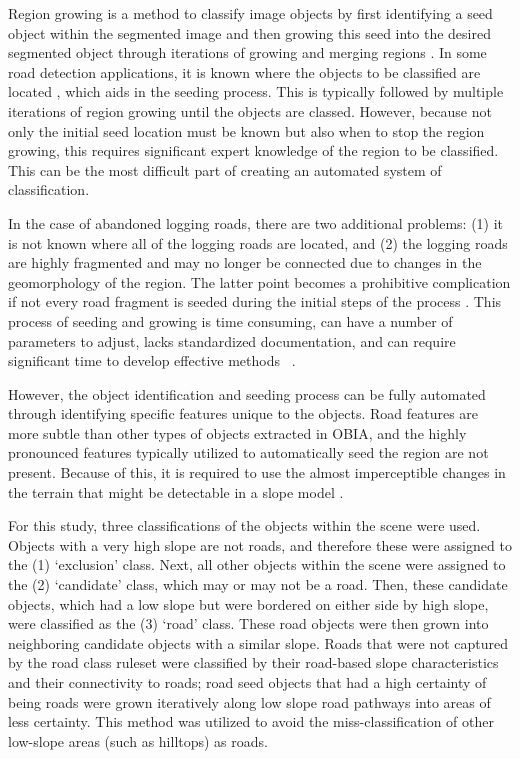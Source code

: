 \documentclass[remotesensing,article,accept,pdftex,moreauthors]{Definitions/mdpi}
\begin{document}
Region growing is a method to classify image objects by first identifying a seed object within the segmented image and then growing this seed into the desired segmented object through iterations of growing and merging regions \cite{benz}. In some road detection applications, it is known where the objects to be classified are located \cite{li}, which aids in the seeding process. This is typically followed by multiple iterations of region growing until the objects are classed. However, because not only the initial seed location must be known but also when to stop the region growing, this requires significant expert knowledge of the region to be classified. This can be the most difficult part of creating an automated system of classification.

In the case of abandoned logging roads, there are two additional problems: (1) it is not known where all of the logging roads are located, and (2) the logging roads are highly fragmented and may no longer be connected due to changes in the geomorphology of the region. The latter point becomes a prohibitive complication if not every road fragment is seeded during the initial steps of the process \cite{li}. This process of seeding and growing is time consuming, can have a number of parameters to adjust, lacks standardized documentation, and can require significant time to develop effective methods %
~\cite{idrees}. 

However, the object identification and seeding process can be fully automated through identifying specific features unique to the objects.   Road features are more   subtle than other types of objects extracted in OBIA, and the highly pronounced features typically utilized to automatically seed the region are not present. Because of this, it is required to use the almost imperceptible changes in the terrain that might be detectable in a slope model \cite{luca, erikson, sherba, zhen}.

For this study, three classifications of the objects within the scene were used. Objects with a very high slope are not roads, and therefore these were assigned to the (1) ‘exclusion’ class. Next, all other objects within the scene were assigned to the (2) ‘candidate’ class, which may or may not be a road. Then, these candidate objects,   which had a low slope but were bordered on either side by high slope, were classified as the (3) ‘road’ class. These road objects were then grown into   neighboring candidate objects with a similar slope. Roads that were not captured by the road class ruleset were classified by their road-based slope characteristics and their connectivity to roads; road seed objects that had a high certainty of being roads were grown iteratively along low slope road pathways into areas of less certainty.   This method was utilized to avoid the miss-classification of other low-slope areas %
(such as hilltops) as roads.  
\end{document}
